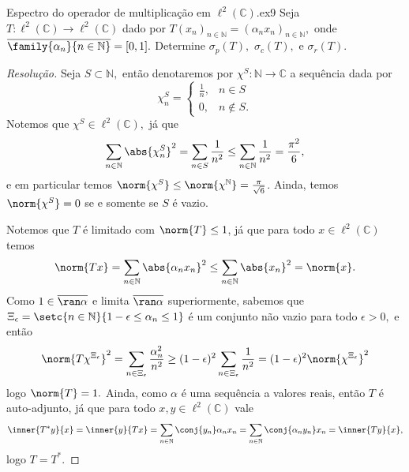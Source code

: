\begin{exercício}{Espectro do operador de multiplicação em \(\ell^2(\mathbb{C}).\)}{ex9}
  Seja \(T : \ell^2(\mathbb{C}) \to \ell^2(\mathbb{C})\) dado por \(T(x_n)_{n \in \mathbb{N}} = (\alpha_n x_n)_{n \in \mathbb{N}},\) onde \(\closure{\family{\alpha_n}{n\in\mathbb{N}}} = [0,1].\) Determine \(\sigma_p(T),\) \(\sigma_c(T),\) e \(\sigma_r(T).\)
\end{exercício}
\begin{proof}[Resolução]
  Seja \(S \subset \mathbb{N},\) então denotaremos por \(\chi^S : \mathbb{N} \to \mathbb{C}\) a sequência dada por
  \begin{equation*}
      \chi^S_n = \begin{cases}
        \frac{1}{n},& n \in S\\
        0,& n \notin S.
      \end{cases}
  \end{equation*}
  Notemos que \(\chi^S \in \ell^2(\mathbb{C}),\) já que
  \begin{equation*}
    \sum_{n \in \mathbb{N}}{\abs{\chi^S_n}^2} = \sum_{n \in S}{\frac{1}{n^2}} \leq \sum_{n \in \mathbb{N}}{\frac{1}{n^2}} = \frac{\pi^2}{6},
  \end{equation*}
  e em particular temos \(\norm{\chi^S} \leq \norm{\chi^{\mathbb{N}}} = \frac{\pi}{\sqrt{6}}\). Ainda, temos \(\norm{\chi^S} = 0\) se e somente se \(S\) é vazio.

  Notemos que \(T\) é limitado com \(\norm{T} \leq 1\), já que para todo \(x \in \ell^2(\mathbb{C})\) temos
  \begin{equation*}
    \norm{Tx} = \sum_{n \in \mathbb{N}}{\abs{\alpha_nx_n}^2} \leq \sum_{n \in \mathbb{N}}{\abs{x_n}^2} = \norm{x}.
  \end{equation*}
  Como \(1 \in \closure{\ran \alpha}\) e limita \(\closure{\ran\alpha}\) superiormente, sabemos que \(\Xi_\epsilon = \setc{n \in \mathbb{N}}{1 - \epsilon \leq \alpha_n \leq 1}\) é um conjunto não vazio para todo \(\epsilon > 0,\) e então
  \begin{equation*}
    \norm{T \chi^{\Xi_\epsilon}}^2 = \sum_{n \in \Xi_\epsilon}{\frac{\alpha_n^2}{n^2}} \geq (1 - \epsilon)^2 \sum_{n \in \Xi_\epsilon}{\frac{1}{n^2}} = (1 - \epsilon)^2 \norm{\chi^{\Xi_\epsilon}}^2
  \end{equation*}
  logo \(\norm{T} = 1.\) Ainda, como \(\alpha\) é uma sequência a valores reais, então \(T\) é auto-adjunto, já que para todo \(x, y \in \ell^2(\mathbb{C})\) vale
  \begin{equation*}
    \inner{T^*y}{x} = \inner{y}{Tx} = \sum_{n\in\mathbb{N}}{\conj{y_n} \alpha_n x_n} = \sum_{n\in\mathbb{N}}{\conj{\alpha_n y_n}x_n} = \inner{Ty}{x},
  \end{equation*}
  logo \(T = T^*.\)


\end{proof}
